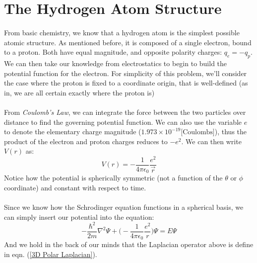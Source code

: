 \documentclass[12pt,letterpaper]{book}
\begin{document}

\section{The Hydrogen Atom Structure}
\paragraph*{}From basic chemistry, we know that a hydrogen atom is the simplest possible atomic structure. As mentioned before, it is composed of a single electron, bound to a proton. Both have equal magnitude, and opposite polarity charges: $q_e = -q_p$. We can then take our knowledge from electrostatics to begin to build the potential function for the electron. For simplicity of this problem, we'll consider the case where the proton is fixed to a coordinate origin, that is well-defined (as in, we are all certain exactly where the proton is)

\paragraph*{}From \textit{Coulomb's Law}, we can integrate the force between the two particles over distance to find the governing potential function. 
We can also use the variable $e$ to denote the elementary charge magnitude ($1.973 \times 10^{-19} \text{[Coulombs]}$), thus the product of the electron and proton charges reduces to $-e^2$. We can then write $V(r)$ as:
\begin{equation}
V(r) = -\frac{1}{4\pi\epsilon_0}\frac{e^2}{\vec{r}}
\end{equation}
Notice how the potential is spherically symmetric (not a function of the $\theta$ or $\phi$ coordinate) and constant with respect to time.

\paragraph*{}Since we know how the Schrodinger equation functions in a spherical basis, we can simply insert our potential into the equation:
\begin{equation}
-\frac{\hbar^2}{2m}\nabla^2\Psi + 
\Big(-\frac{1}{4\pi\epsilon_0}\frac{e^2}{r}\Big)\Psi = E\Psi
\end{equation}
And we hold in the back of our minds that the Laplacian operator above is define in eqn. (\ref{3D Polar Laplacian}).
\end{document}
